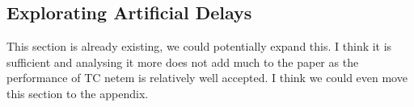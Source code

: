 \documentclass{article}
\begin{document}









 



\subsection{Explorating Artificial Delays}

This section is already existing, we could potentially expand this. I think it is sufficient and analysing it more does not add much to the paper as the performance of TC netem is relatively well accepted. I think we could even move this section to the appendix.
\end{document}
